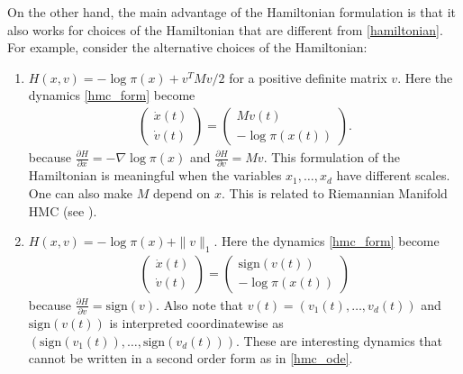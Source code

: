 \documentclass{scrartcl}
\begin{document}
On the other hand, the main advantage of the Hamiltonian formulation
is that it also works for choices of the Hamiltonian that are
different from \eqref{hamiltonian}. For example, consider the
alternative choices of the Hamiltonian:
\begin{enumerate}
\item $H(x, v) = -\log \pi(x) + v^T M v/2$ for a positive definite
  matrix $v$. Here the dynamics \eqref{hmc_form} become 
  \begin{align*}
    \begin{pmatrix}
      \dot{x}(t) \\ \dot{v}(t)
    \end{pmatrix} =
    \begin{pmatrix}
      M v(t) \\ -\log \pi(x(t))
    \end{pmatrix}. 
  \end{align*}
 because
  $\frac{\partial H}{\partial x} = -\nabla \log \pi(x)$ and
  $\frac{\partial H}{\partial v} = M v$. 
  This formulation of the Hamiltonian is meaningful when the variables
  $x_1, \dots, x_d$ have different scales. One can also make $M$
  depend on $x$. This is related to Riemannian Manifold HMC (see
  \citet{girolami2011riemann}).
 \item $H(x, v) = -\log \pi(x) + \|v\|_1$. Here the dynamics
   \eqref{hmc_form} become
   \begin{align*}
    \begin{pmatrix}
      \dot{x}(t) \\ \dot{v}(t)
    \end{pmatrix} =
    \begin{pmatrix}
      \text{sign}(v(t)) \\ -\log \pi(x(t))
    \end{pmatrix}
   \end{align*}
 because $\frac{\partial H}{\partial v} = \text{sign}(v)$. Also note
 that $v(t) = (v_1(t), \dots, v_d(t))$ and $\text{sign}(v(t))$ is
 interpreted coordinatewise as $(\text{sign}(v_1(t)), \dots,
 \text{sign}(v_d(t)))$. These are interesting dynamics that cannot be
 written in a second order form as in \eqref{hmc_ode}. 
\end{enumerate}
\end{document}
